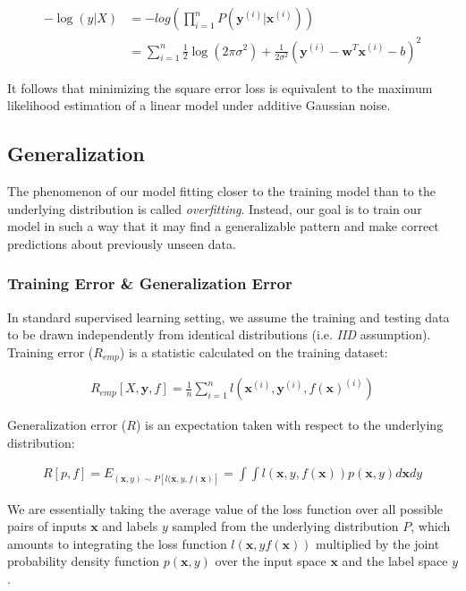 \documentclass[a4paper,12pt]{article}
\theoremstyle{definition}
\begin{document}
\begin{align*}
    -\log(y|X) & = -log(\prod_{i=1}^{n}P(\mathbf{y}^{(i)}|\mathbf{x}^{(i)}))                                                               \\
               & = \sum_{i=1}^{n} \frac{1}{2}\log(2\pi\sigma^2) + \frac{1}{2\sigma^2}(\mathbf{y}^{(i)}-\mathbf{w}^T\mathbf{x}^{(i)} - b)^2
\end{align*}

It follows that minimizing the square error loss is equivalent to the maximum likelihood estimation of a linear model
under additive Gaussian noise.

\subsection*{Generalization}
The phenomenon of our model fitting closer to the training model than to the underlying distribution is called \textit{overfitting}.
Instead, our goal is to train our model in such a way that it may find a generalizable pattern and make correct
predictions about previously unseen data.
\subsubsection*{Training Error \& Generalization Error}
In standard supervised learning setting, we assume the training and testing data to be drawn independently from
identical distributions (i.e. \textit{IID} assumption).
Training error ($R_{emp}$) is a statistic calculated on the training dataset:

\begin{align*}
    R_{emp}[X,\mathbf{y},f] = \frac{1}{n}\sum_{i=1}^{n}l(\mathbf{x}^{(i)},\mathbf{y}^{(i)},f(\mathbf{x})^{(i)})
\end{align*}

Generalization error ($R$) is an expectation taken with respect to the underlying distribution:

\begin{align*}
    R[p,f] = E_{(\mathbf{x},y)\sim P[l(\mathbf{x},y,f(\mathbf{x})]} = \int\int l(\mathbf{x},y,f(\mathbf{x}))p(\mathbf{x},y)d\mathbf{x}dy
\end{align*}

We are essentially taking the average value of the loss function over all possible pairs of inputs $\mathbf{x}$ and labels $y$ sampled from
the underlying distribution $P$, which amounts to integrating the loss function $l(\mathbf{x}, y f(\mathbf{x}))$ multiplied by the joint probability
density function $p(\mathbf{x}, y)$ over the input space $\mathbf{x}$ and the label space $y$.
\end{document}
